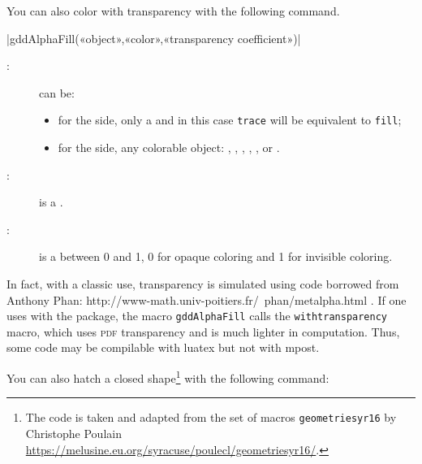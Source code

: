\documentclass[a4paper,english]{article}
\begin{document}
You can also color with transparency with the following command.
\begin{colourband}
\macro|gddAlphaFill(«object»,«color»,«transparency coefficient»)|
\begin{description}
  \item[:] can be:
  \begin{itemize}
    \item for the \MP{} side, only a  and in this case \lstinline+trace+ will be equivalent to \lstinline+fill+;
    \item for the \mpgeomdd side,
  any colorable object: ,
   , , , , or
  .
  \end{itemize}
  \item[:] is a .
  \item[:] is a  between 0 and 1, 0 for opaque coloring and 1 for invisible coloring.
\end{description}
\end{colourband}

In fact, with a classic use, transparency is simulated using code borrowed from Anthony Phan:
http://www-math.univ-poitiers.fr/~phan/metalpha.html
.
If one uses \mpgeomdd with the  package, the macro \lstinline+gddAlphaFill+ calls the \lstinline+withtransparency+ macro, which uses \textsc{pdf} transparency and is much lighter in computation. Thus, some code may be compilable with luatex but not with mpost.

You can also hatch a closed shape\footnote{The code is taken and adapted from the set of macros \texttt{geometriesyr16} by Christophe Poulain \url{https://melusine.eu.org/syracuse/poulecl/geometriesyr16/}.} with the following command:
\end{document}
